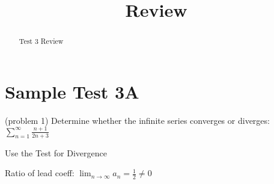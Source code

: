 \documentclass[handout]{ximera}
\title{Review}
\begin{document}
\begin{abstract}
Test 3 Review
\end{abstract}

\maketitle

\section{Sample Test 3A}
















\begin{problem}(problem 1)
Determine whether the infinite series converges or diverges: $\displaystyle \sum_{n=1}^\infty \frac{n+1}{2n+3}$

\begin{hint}
Use the Test for Divergence
\end{hint}

\begin{hint}
Ratio of lead coeff: $\displaystyle \lim_{n \to \infty} a_n = \frac12 \neq 0$
\end{hint}

\end{problem}
\end{document}

